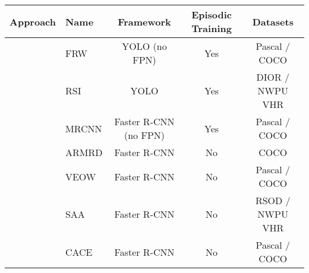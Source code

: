 \begin{table}[h]

    \label{tab:comparison}
    \begin{adjustbox}{width=0.75\textwidth}
        \begin{tabular}{@{}llccc}
            \toprule[1pt]
            \textbf{Approach}                                                                    & \textbf{Name}                                      & \textbf{Framework}         & \textbf{Episodic Training}  & \textbf{Datasets}                  \\ \hline
            \cellcolor{white}                                                                    &  FRW \parencite{kang2019few}                        & YOLO (no FPN)              & Yes                         & Pascal / COCO                     \\
            \cellcolor{white}                                                                    & RSI   \parencite{deng2020few}                     & YOLO                       & Yes                         & DIOR / NWPU VHR                    \\
            \cellcolor{white}                                                                    & MRCNN \parencite{yan2019meta}                     & Faster R-CNN (no FPN)      & Yes                         & Pascal / COCO                      \\
            \cellcolor{white}                                                                    & ARMRD \parencite{fan2020fsod}                     & Faster R-CNN               & No                          & COCO                               \\
            \cellcolor{white}                                                                    & VEOW  \parencite{xiao2020few}                     & Faster R-CNN               & No                          & Pascal / COCO                      \\
            \cellcolor{white}                                                                    & SAA \parencite{xiao2020fsod}                    & Faster R-CNN               & No                          & RSOD / NWPU VHR                    \\
            \cellcolor{white}                                                                    & CACE  \parencite{wallach2019one}                  & Faster R-CNN               & No                          & Pascal / COCO                      \\

\end{tabular}
\end{adjustbox}
\end{table}
